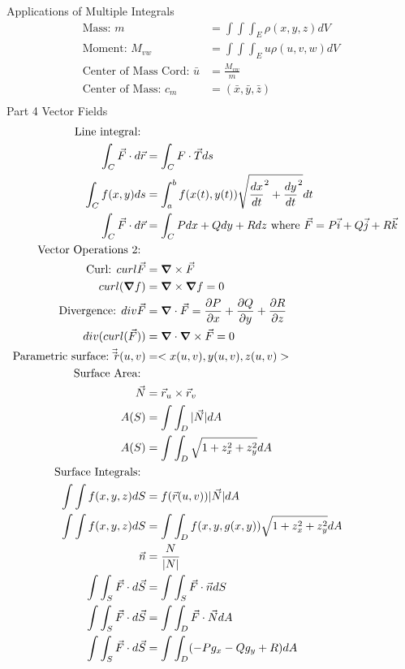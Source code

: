 \documentclass[12pt]{article}
\newcommand{\gv}[1]{\ensuremath{\mbox{\boldmath$ #1 $}}}
\newcommand{\grad}[1]{\gv{\nabla} #1} %
\renewcommand{\div}[1]{\gv{\nabla} \cdot #1} %
\newcommand{\curl}[1]{\gv{\nabla} \times #1} %
\renewcommand{\=}[1]{\stackrel{#1}{=}} %
\theoremstyle{definition}
\theoremstyle{remark}
\begin{document}
Applications of Multiple Integrals
\begin{align*}
  \textrm{Mass: } m &= \int\int\int_E \rho(x,y,z)dV\\
  \textrm{Moment: } M_{vw}&= \int\int\int_Eu\rho(u,v,w)dV\\
  \textrm{Center of Mass Cord: }\bar u &= \frac{M_{vw}}{m}\\
  \textrm{Center of Mass: } c_m &= (\bar x,\bar y, \bar z)\\
\end{align*}
Part 4
Vector Fields
\begin{align*}
  \textrm{Line integral: }\\
  \int_C \vec F \cdot d \vec r &= \int_C F \cdot \vec T ds\\
  \int_C f(x,y)ds &=\int_a^bf(x(t),y(t))\sqrt{\frac{dx}{dt}^2+\frac{dy}{dt}^2}dt\\
  \int_C \vec F \cdot d\vec r &= \int_C P{dx}+Q{dy}+R{dz} \textrm{
    where  }\vec F = P \vec i + Q \vec j + R \vec k\\
  \textrm{Vector Operations 2: }\\
  \textrm{Curl: } curl \vec F &= \curl \vec F\\
  curl(\grad f) &= \curl \grad f= 0\\
  \textrm{Divergence: } div \vec F &= \div \vec F = \frac{\partial
    P}{\partial x}+\frac{\partial Q}{\partial y} + \frac{\partial
    R}{\partial z}\\
  div(curl (\vec F))&=\div\curl \vec F = 0\\
  \textrm{Parametric surface: } \vec \vec r(u,v) &= <x(u,v),y(u,v),z(u,v)>\\
  \textrm{Surface Area: }\\
  \vec N &= \vec r_u \times \vec r_v\\
  A(S) &= \int\int_D |\vec N|dA\\
  A(S) &= \int\int_D \sqrt{1 + z_x^2+z_y^2}dA\\
  \textrm{Surface Integrals: }\\
  \int\int f(x,y,z)dS &= f(\vec r(u,v))|\vec N|dA\\
  \int\int f(x,y,z)dS &= \int\int_D f(x,y,g(x,y))\sqrt{1 +
    z_x^2+z_y^2}dA\\
  \vec n &= \frac{N}{|N|}\\
  \int\int_S \vec F \cdot d\vec S &=\int\int_S \vec F \cdot \vec n
  dS\\ 
  \int\int_S \vec F \cdot d\vec S &=\int\int_D \vec F \cdot \vec N
  dA\\
  \int\int_S \vec F \cdot d\vec S &= \int\int_D(-Pg_x-Qg_y+R)dA\\
\end{align*}
\end{document}
